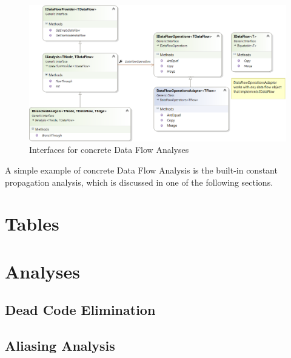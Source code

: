 \begin{figure}[h]  
  \centering
    \includegraphics*[width=\textwidth,height=\textheight,keepaspectratio]{img/dataflow-ifaces.png}  
    \caption{Interfaces for concrete Data Flow Analyses\label{dataflowifaces}}
\end{figure}

        A simple example of concrete Data Flow Analysis is the built-in 
        constant propagation analysis, which is discussed in one of the 
        following sections.
        
    \section{Tables}        
    
    \section{Analyses}
        \subsection{Dead Code Elimination}
        
        \subsection{Aliasing Analysis}        
        

